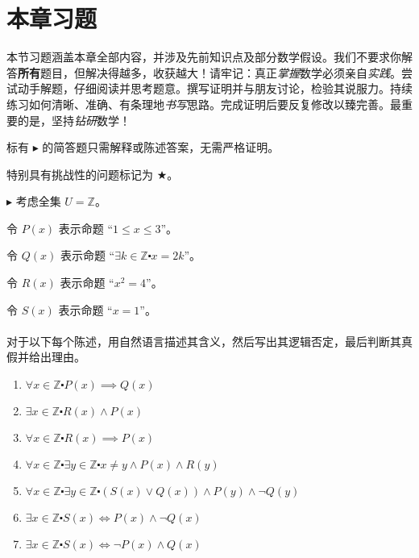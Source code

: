 \section{本章习题}

本节习题涵盖本章全部内容，并涉及先前知识点及部分数学假设。我们不要求你解答\textbf{所有}题目，但解决得越多，收获越大！请牢记：真正\emph{掌握}数学必须亲自\emph{实践}。尝试动手解题，仔细阅读并思考题意。撰写证明并与朋友讨论，检验其说服力。持续练习如何清晰、准确、有条理地\emph{书写}思路。完成证明后要反复修改以臻完善。最重要的是，坚持\emph{钻研}数学！

标有 $\blacktriangleright$ 的简答题只需解释或陈述答案，无需严格证明。

特别具有挑战性的问题标记为 $\bigstar$。\\

\begin{exercise}
    $\blacktriangleright$ 考虑全集 $U=\mathbb{Z}$。

    令 $P(x)$ 表示命题 ``$1 \le x \le 3$''。

    令 $Q(x)$ 表示命题 ``$\exists k \in \mathbb{Z} \centerdot x=2k$''。

    令 $R(x)$ 表示命题 ``$x^2=4$''。

    令 $S(x)$ 表示命题 ``$x=1$''。\\
    \\
    对于以下每个陈述，用自然语言描述其含义，然后写出其逻辑否定，最后判断其真假并给出理由。

    \begin{enumerate}[label=(\alph*)]
        \item $\forall x \in \mathbb{Z} \centerdot P(x) \implies Q(x)$
        \item $\exists x \in \mathbb{Z} \centerdot R(x) \land P(x)$
        \item $\forall x \in \mathbb{Z} \centerdot R(x) \implies P(x)$
        \item $\forall x \in \mathbb{Z} \centerdot \exists y \in \mathbb{Z} \centerdot x \ne y \land P(x) \land R(y)$
        \item $\forall x \in \mathbb{Z} \centerdot \exists y \in \mathbb{Z} \centerdot (S(x) \lor Q(x)) \land P(y) \land \neg Q(y)$
        \item $\exists x \in \mathbb{Z} \centerdot S(x) \iff P(x) \land \neg Q(x)$
        \item $\exists x \in \mathbb{Z} \centerdot S(x) \iff \neg P(x) \land Q(x)$
    \end{enumerate}
\end{exercise}


